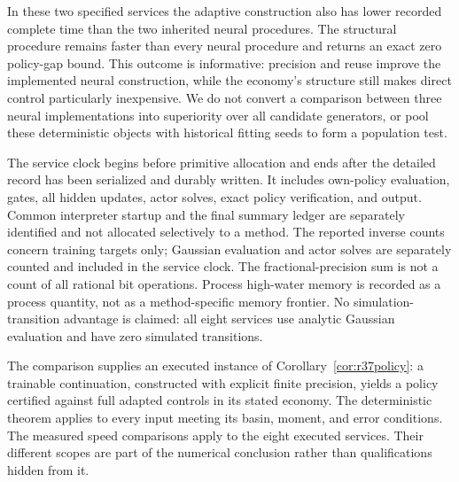 \documentclass[ecta,nameyear,draft]{econsocart}
\theoremstyle{definition}
\theoremstyle{remark}
\begin{document}
In these two specified services the adaptive construction also has lower
recorded complete time than the two inherited neural procedures. The
structural procedure remains faster than every neural procedure and returns
an exact zero policy-gap bound. This outcome is informative: precision and
reuse improve the implemented neural construction, while the economy's
structure still makes direct control particularly inexpensive. We do not
convert a comparison between three neural implementations into superiority
over all candidate generators, or pool these deterministic objects with
historical fitting seeds to form a population test.

The service clock begins before primitive allocation and ends after the
detailed record has been serialized and durably written. It includes
own-policy evaluation, gates, all hidden updates, actor solves, exact policy
verification, and output. Common interpreter startup and the final summary
ledger are separately identified and not allocated selectively to a method.
The reported inverse counts concern training targets only; Gaussian evaluation
and actor solves are separately counted and included in the service clock.
The fractional-precision sum is not a count of all rational bit operations.
Process high-water memory is recorded as a process quantity, not as a
method-specific memory frontier. No simulation-transition advantage is claimed:
all eight services use analytic Gaussian evaluation and have zero simulated
transitions.

The comparison supplies an executed instance of
Corollary~\ref{cor:r37policy}: a trainable continuation, constructed with
explicit finite precision, yields a policy certified against full adapted
controls in its stated economy. The deterministic theorem applies to every
input meeting its basin, moment, and error conditions. The measured speed
comparisons apply to the eight executed services. Their different scopes are
part of the numerical conclusion rather than qualifications hidden from it.

\end{document}
